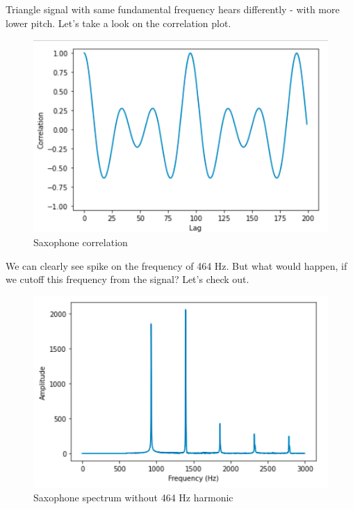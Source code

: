 \documentclass[a4paper]{article}
\begin{document}
            Triangle signal with same fundamental frequency hears differently - with more lower pitch.
            Let's take a look on the correlation plot.
            
            \begin{figure}[H]
                \centering
                \includegraphics[width=\textwidth]{img/sac_corr.png}
                \caption{Saxophone correlation}
                \label{fig:part42}
            \end{figure}
            
            We can clearly see spike on the frequency of 464 Hz.
            But what would happen, if we cutoff this frequency from the signal? Let's check out.
            
            \begin{figure}[H]
                \centering
                \includegraphics[width=\textwidth]{img/sac_filt.png}
                \caption{Saxophone spectrum without 464 Hz harmonic}
                \label{fig:part42}
            \end{figure}
            
\end{document}
